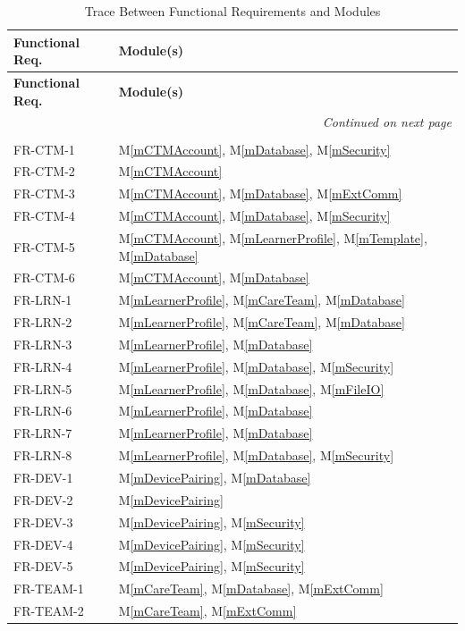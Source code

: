 \documentclass[12pt, titlepage]{article}
\newcommand{\mref}[1]{M\ref{#1}}
\begin{document}
\begin{longtable}{p{} p{}}
\toprule
\textbf{Functional Req.} & \textbf{Module(s)}\\
\midrule
\endfirsthead
\toprule
\textbf{Functional Req.} & \textbf{Module(s)}\\
\midrule
\endhead
\midrule
\multicolumn{2}{r}{\textit{Continued on next page}}\\
\endfoot
\bottomrule
\caption{Trace Between Functional Requirements and Modules}
\label{TblRT}\\
\endlastfoot
FR-CTM-1 & \mref{mCTMAccount}, \mref{mDatabase}, \mref{mSecurity}\\
FR-CTM-2 & \mref{mCTMAccount}\\
FR-CTM-3 & \mref{mCTMAccount}, \mref{mDatabase}, \mref{mExtComm}\\
FR-CTM-4 & \mref{mCTMAccount}, \mref{mDatabase}, \mref{mSecurity}\\
FR-CTM-5 & \mref{mCTMAccount}, \mref{mLearnerProfile}, \mref{mTemplate}, \mref{mDatabase}\\
FR-CTM-6 & \mref{mCTMAccount}, \mref{mDatabase}\\
FR-LRN-1 & \mref{mLearnerProfile}, \mref{mCareTeam}, \mref{mDatabase}\\
FR-LRN-2 & \mref{mLearnerProfile}, \mref{mCareTeam}, \mref{mDatabase}\\
FR-LRN-3 & \mref{mLearnerProfile}, \mref{mDatabase}\\
FR-LRN-4 & \mref{mLearnerProfile}, \mref{mDatabase}, \mref{mSecurity}\\
FR-LRN-5 & \mref{mLearnerProfile}, \mref{mDatabase}, \mref{mFileIO}\\
FR-LRN-6 & \mref{mLearnerProfile}, \mref{mDatabase}\\
FR-LRN-7 & \mref{mLearnerProfile}, \mref{mDatabase}\\
FR-LRN-8 & \mref{mLearnerProfile}, \mref{mDatabase}, \mref{mSecurity}\\
FR-DEV-1 & \mref{mDevicePairing}, \mref{mDatabase}\\
FR-DEV-2 & \mref{mDevicePairing}\\
FR-DEV-3 & \mref{mDevicePairing}, \mref{mSecurity}\\
FR-DEV-4 & \mref{mDevicePairing}, \mref{mSecurity}\\
FR-DEV-5 & \mref{mDevicePairing}, \mref{mSecurity}\\
FR-TEAM-1 & \mref{mCareTeam}, \mref{mDatabase}, \mref{mExtComm}\\
FR-TEAM-2 & \mref{mCareTeam}, \mref{mExtComm}\\

\end{longtable}
\end{document}
